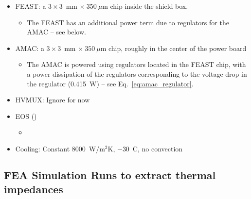 \def\thcc{\ensuremath{\overline{T}_\text{nHCC}}}
\def\tabc{\ensuremath{\overline{T}_\text{nABC}}}
\def\tfeast{\ensuremath{\overline{T}_\text{FEAST}}}
\def\tsensor{\ensuremath{T_\text{sensor}}}
\def\Rm{\ensuremath{{\text{R}m}}}

\begin{itemize}
\item FEAST: a $3\times3$~mm $\times~350~\mu$m chip inside the shield box.
  \begin{itemize}
  \item The FEAST has an additional power term due to regulators for the AMAC -- see below.
  \end{itemize}
\item AMAC: a $3\times3$~mm $\times~350~\mu$m chip, roughly in the center of the power board
  \begin{itemize}
    \item The AMAC is powered using regulators located in the FEAST chip, with a power dissipation
      of the regulators corresponding to the voltage drop in the regulator (0.415~W) -- see Eq.~\ref{eq:amac_regulator}.
  \end{itemize}
\item HVMUX: Ignore for now
\item EOS () %
  \begin{itemize}
  \item {}
  \end{itemize}
\item Cooling: Constant 8000~W/m$^{2}$K, $-30$~C, no convection
\end{itemize}




\subsection{FEA Simulation Runs to extract thermal impedances}


